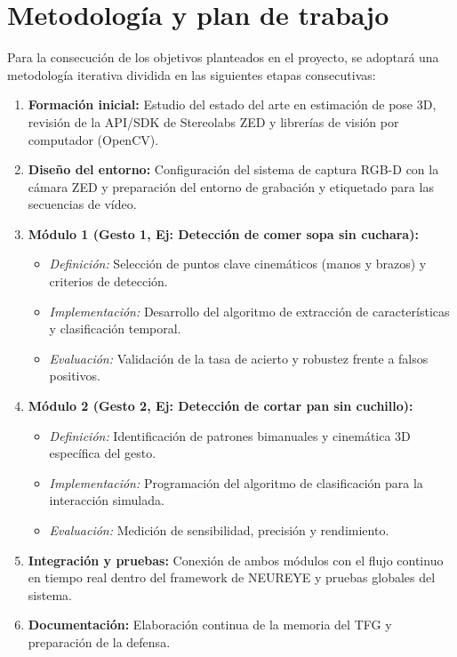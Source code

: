 \documentclass[11pt,a4paper,oneside]{article}
\begin{document}
		\section{Metodología y plan de trabajo}
		\label{sec:metodologia-y-plan}
		Para la consecución de los objetivos planteados en el proyecto, se adoptará una metodología iterativa dividida en las siguientes etapas consecutivas:
		
		\begin{enumerate}
			\item \textbf{Formación inicial:} Estudio del estado del arte en estimación de pose 3D, revisión de la API/SDK de Stereolabs ZED y librerías de visión por computador (OpenCV).
			\item \textbf{Diseño del entorno:} Configuración del sistema de captura RGB-D con la cámara ZED y preparación del entorno de grabación y etiquetado para las secuencias de vídeo.
			\item \textbf{Módulo 1 (Gesto 1, Ej: Detección de comer sopa sin cuchara):} 
			\begin{itemize}
				\item \textit{Definición:} Selección de puntos clave cinemáticos (manos y brazos) y criterios de detección.
				\item \textit{Implementación:} Desarrollo del algoritmo de extracción de características y clasificación temporal.
				\item \textit{Evaluación:} Validación de la tasa de acierto y robustez frente a falsos positivos.
			\end{itemize}
			\item \textbf{Módulo 2 (Gesto 2, Ej: Detección de cortar pan sin cuchillo):}
			\begin{itemize}
				\item \textit{Definición:} Identificación de patrones bimanuales y cinemática 3D específica del gesto.
				\item \textit{Implementación:} Programación del algoritmo de clasificación para la interacción simulada.
				\item \textit{Evaluación:} Medición de sensibilidad, precisión y rendimiento.
			\end{itemize}
			\item \textbf{Integración y pruebas:} Conexión de ambos módulos con el flujo continuo en tiempo real dentro del framework de NEUREYE y pruebas globales del sistema.
			\item \textbf{Documentación:} Elaboración continua de la memoria del TFG y preparación de la defensa.
		\end{enumerate}
		
\end{document}
